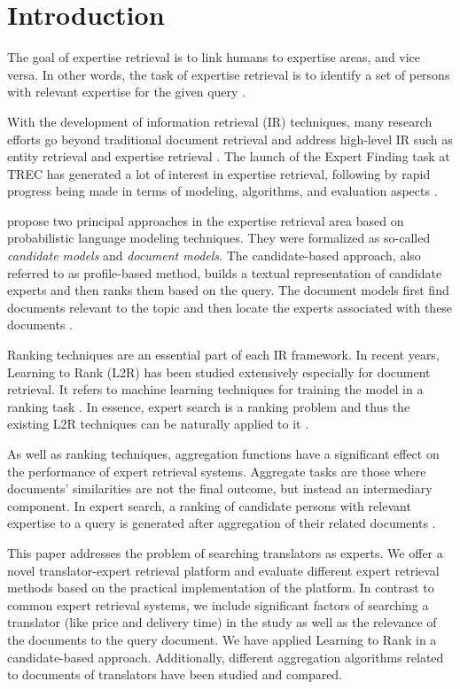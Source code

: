 \section{Introduction}
\label{sec:introduction}
The goal of expertise retrieval is to link humans to expertise areas, and vice versa. In other words, the task of expertise retrieval is to identify a set of persons with relevant expertise for the given query \citep{er, er-community-aware}.

With the development of information retrieval (IR) techniques, many research efforts go beyond traditional document retrieval and address high-level IR such as entity retrieval and expertise retrieval \citep{er-sparse}. The launch of the Expert Finding task at TREC has generated a lot of interest in expertise retrieval, following by rapid progress being made in terms of modeling, algorithms, and evaluation aspects \citep{trec2005, er-community-aware}.

\citet{trec2005} propose two principal approaches  in the expertise retrieval area based on probabilistic language modeling techniques. They were formalized as so-called \textit{candidate models} and \textit{document models}. The candidate-based approach, also referred to as profile-based method, builds a textual representation of candidate experts and then ranks them based on the query. The document models first find documents relevant to the topic and then locate the experts associated with these documents \citep{er}.

Ranking techniques are an essential part of each IR framework. In recent years, Learning to Rank (L2R) has been studied extensively especially for document retrieval. It refers to machine learning techniques for training the model in a ranking task \citep{er}. In essence, expert search is a ranking problem and thus the existing L2R techniques can be naturally applied to it \citep{l2r-intro}.

As well as ranking techniques, aggregation functions have a significant effect on the performance of expert retrieval systems. Aggregate tasks are those where documents' similarities are not
the final outcome, but instead an intermediary component. In expert search, a ranking of candidate persons with relevant expertise to a query is generated after aggregation of their related documents \citep{agg-learning}.

This paper addresses the problem of searching translators as experts. We offer a novel translator-expert retrieval platform and evaluate different expert retrieval methods based on the practical implementation of the platform. In contrast to common expert retrieval systems, we include significant factors of searching a translator (like price and delivery time) in the study as well as the relevance of the documents to the query document. We have applied Learning to Rank in a candidate-based approach. Additionally, different aggregation algorithms related to documents of translators have been studied and compared.

